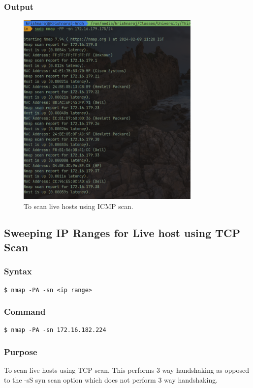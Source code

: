 \documentclass[11pt]{article}
\begin{document}
\subsubsection*{Output}
\begin{figure}[H]
    \centering
    \includegraphics[width=0.8\textwidth]{icmp scan.png}
    \caption{To scan live hosts using ICMP scan.}
    \label{fig:1}
\end{figure}

\subsection{Sweeping IP Ranges for Live host using TCP Scan}

\subsubsection{Syntax}
\begin{verbatim}
$ nmap -PA -sn <ip range>
\end{verbatim}

\subsubsection*{Command}
\begin{verbatim}
$ nmap -PA -sn 172.16.182.224
\end{verbatim}

\subsubsection*{Purpose}
To scan live hosts using TCP scan. This performs 3 way handshaking as opposed to the -sS syn scan option which does not perform 3 way handshaking.
\end{document}
